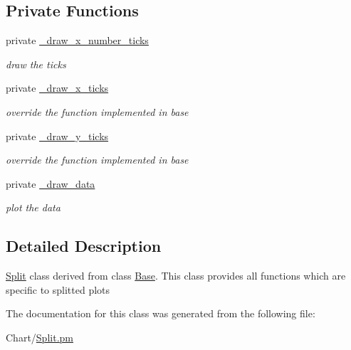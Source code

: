\subsection*{Private Functions}
\label{_amgrp8d29cff216bafa3117e21883ea7c6b5f}
 \begin{DoxyCompactItemize}
\item 
\hypertarget{classChart_1_1Split_a9acbd65cad87e7571b02687e9efbe2dd}{
private \hyperlink{classChart_1_1Split_a9acbd65cad87e7571b02687e9efbe2dd}{\_\-draw\_\-x\_\-number\_\-ticks}}
\label{classChart_1_1Split_a9acbd65cad87e7571b02687e9efbe2dd}

\begin{DoxyCompactList}\small\item\em draw the ticks \item\end{DoxyCompactList}\item 
\hypertarget{classChart_1_1Split_af95c5609fac7bd93d85c3f43db943e21}{
private \hyperlink{classChart_1_1Split_af95c5609fac7bd93d85c3f43db943e21}{\_\-draw\_\-x\_\-ticks}}
\label{classChart_1_1Split_af95c5609fac7bd93d85c3f43db943e21}

\begin{DoxyCompactList}\small\item\em override the function implemented in base \item\end{DoxyCompactList}\item 
\hypertarget{classChart_1_1Split_a01d9dbce6162528c77c407000a7267f2}{
private \hyperlink{classChart_1_1Split_a01d9dbce6162528c77c407000a7267f2}{\_\-draw\_\-y\_\-ticks}}
\label{classChart_1_1Split_a01d9dbce6162528c77c407000a7267f2}

\begin{DoxyCompactList}\small\item\em override the function implemented in base \item\end{DoxyCompactList}\item 
\hypertarget{classChart_1_1Split_a7194ba0840dbc7d699c0582b61e9cb80}{
private \hyperlink{classChart_1_1Split_a7194ba0840dbc7d699c0582b61e9cb80}{\_\-draw\_\-data}}
\label{classChart_1_1Split_a7194ba0840dbc7d699c0582b61e9cb80}

\begin{DoxyCompactList}\small\item\em plot the data \item\end{DoxyCompactList}\end{DoxyCompactItemize}


\subsection{Detailed Description}
\hyperlink{classChart_1_1Split}{Split} class derived from class \hyperlink{classChart_1_1Base}{Base}. This class provides all functions which are specific to splitted plots 

The documentation for this class was generated from the following file:\begin{DoxyCompactItemize}
\item 
Chart/\hyperlink{Split_8pm}{Split.pm}\end{DoxyCompactItemize}

